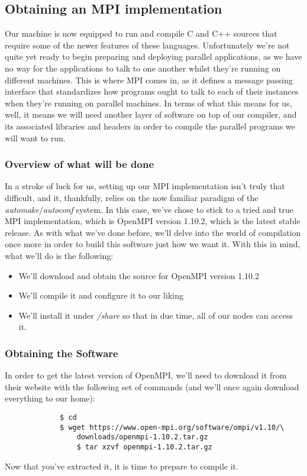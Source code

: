 \documentclass[]{article}
\begin{document}
\subsection{Obtaining an MPI implementation}
Our machine is now equipped to run and compile C and C++ sources that require some of the newer features of these languages.
Unfortunately we're not quite yet ready to begin preparing and deploying parallel applications, as we have no way for the applications
to talk to one another whilst they're running on different machines. This is where MPI comes in, as it defines a message passing
interface that standardizes how programs ought to talk to each of their instances when they're running on parallel machines. In terms
of what this means for us, well, it means we will need another layer of software on top of our compiler, and its associated libraries 
and headers in order to compile the parallel programs we will want to run.

\subsubsection{Overview of what will be done}
In a stroke of luck for us, setting up our MPI implementation isn't truly that difficult, and it, thankfully, relies on the now familiar
paradigm of the \textit{automake}/\textit{autoconf} system. In this case, we've chose to stick to a tried and true MPI implementation,
         which is OpenMPI version 1.10.2, which is the latest stable release. As with what we've done before, we'll delve into the world of
         compilation once more in order to build this software just how we want it. With this in mind, what we'll do is the following:
         \begin{itemize}
         \item We'll download and obtain the source for OpenMPI version 1.10.2
         \item We'll compile it and configure it to our liking
         \item We'll install it under \textit{/share} so that in due time, all of our nodes can access it.
         \end{itemize}

         \subsubsection{Obtaining the Software}
         In order to get the latest version of OpenMPI, we'll need to download it from their website with the following set of commands (and
                 we'll once again download everything to our home):
             \begin{lstlisting}
             $ cd
             $ wget https://www.open-mpi.org/software/ompi/v1.10/\
                 downloads/openmpi-1.10.2.tar.gz
                 $ tar xzvf openmpi-1.10.2.tar.gz
                 \end{lstlisting}
                 Now that you've extracted it, it is time to prepare to compile it.
\end{document}
